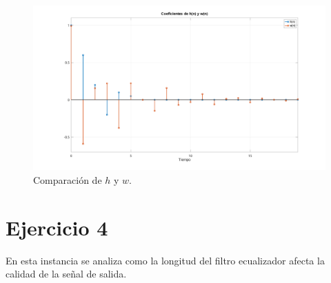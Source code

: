 \begin{figure}[!hbp]
	\centering
	\includegraphics[width=1\linewidth,trim=4cm 0 4cm 0,clip]{img/ej3_coef.pdf}
	\caption{Comparación de $h$ y $w$.}
	\label{fig:ej3_coef}
\end{figure}

\clearpage

\section{Ejercicio 4}

En esta instancia se analiza como la longitud del filtro ecualizador afecta la calidad de la señal de salida.
